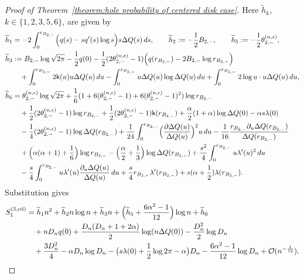 \documentclass[a4paper]{article}
\numberwithin{equation}{section}
\begin{document}
\begin{proof}[Proof of Theorem~\ref{theorem:hole probability of centered disk case}]
Here $\widetilde h_k$, $k\in\{1,2,3,5,6\}$, are given by
\begin{align*}
\widetilde{h}_{1}
&=
-2\int_{0}^{r_{B_{2,-}}}\Bigl(
q(s)-sq'(s)\log s
\Bigr)s\Delta Q(s)\,ds, 
\qquad
\widetilde{h}_2:=-\frac{1}{2}B_{2,-},
\qquad
\widetilde h_5:=-\frac12\theta_{2,-}^{(n,\epsilon)},
\\
    \widetilde{h}_3&:=
        B_{2,-}\log\sqrt{2\pi}-\frac{1}{2}q(0)
-\frac{1}{2}(2\theta_{2,-}^{(n,\epsilon)}-1)
\Bigl( 
q(r_{B_{2,-}})-2B_{2,-}\log r_{B_{2,-}}
\Bigr)
\\
&\quad
+\int_{0}^{r_{B_{2,-}}}2\mathsf{k}(u) u\Delta Q(u)\,du
-\int_{0}^{r_{B_{2,-}}}u\Delta Q(u)\log \Delta Q(u)\,du
+\int_{0}^{r_{B_{2,-}}}2\log u\cdot u\Delta Q(u)\,du, 
\\
 \widetilde{h}_6 
 &=
 \theta_{2,-}^{(n,\epsilon)}\log\sqrt{2\pi}
+\frac{1}{6}(1+6(\theta_{2,-}^{(n,\epsilon)}-1)+6(\theta_{2,-}^{(n,\epsilon)}-1)^2)
\log r_{B_{2,-}}
\\
&\quad
+\frac{1}{2}(2\theta_{2,-}^{(n,\epsilon)}-1)\log r_{B_{2,-}}
+\frac{1}{2}(2\theta_{2,-}^{(n,\epsilon)}-1)\mathsf{k}(r_{B_{2,-}})
+\frac{\alpha}{2}(1+\alpha)\log\Delta Q(0)
-\alpha s\lambda(0)
\\
&\quad
-\frac{1}{4}(2\theta_{2,-}^{(n,\epsilon)}-1)\log\Delta Q(r_{B_{2,-}})
+\frac{1}{24}\int_{0}^{r_{B_{2,-}}}\Bigl(\frac{\partial \Delta Q(u)}{\Delta Q(u)}\Bigr)^2u\,du
-\frac{1}{16}
\frac{r_{B_{2,-}}\partial_u\Delta Q(r_{B_{2,-}})}{\Delta Q(r_{B_{2,-}})}
\\
&\quad
+\Bigl(\alpha(\alpha+1)+\frac{1}{6}\Bigr)\log r_{B_{2,-}}
-\Bigl(\frac{\alpha}{2}+\frac{1}{3}\Bigr)\log\Delta Q(r_{B_{2,-}})
+\frac{s^2}{4}\int_{0}^{r_{B_{2,-}}}u\lambda'(u)^2\,du
\\
&\quad
-\frac{s}{4}\int_{0}^{r_{B_{2,-}}}u\lambda'(u)\frac{\partial_u\Delta Q(u)}{\Delta Q(u)}\,du
+\frac{s}{4}r_{B_{2,-}}\lambda'(r_{B_{2,-}})
+s(\alpha +\frac{1}{2})\lambda(r_{B_{2,-}}).
\end{align*}
Substitution gives
\begin{align*}
S_1^{(3,\mathrm{cd})}
&=\widetilde{h}_{1}n^2+\widetilde{h}_2n\log n+\widetilde{h}_3n
+\Bigl(\widetilde{h}_5+\frac{6\alpha^2-1}{12}\Bigr)\log n
+\widetilde{h}_6
\\
&\quad
+nD_nq(0)
+\frac{D_n(D_n+1+2\alpha)}{2}\log (n\Delta Q(0))
-\frac{D_n^2}{2}\log D_n
\\
&\quad
+\frac{3D_n^2}{4}
-\alpha D_n\log D_n
-\bigl(s\lambda(0)+\frac{1}{2}\log 2\pi-\alpha\bigr)D_n
-\frac{6\alpha^2-1}{12}\log D_n
+\mathcal{O}(n^{-\frac{1}{12}}). 
\end{align*}

\end{proof}
\end{document}
